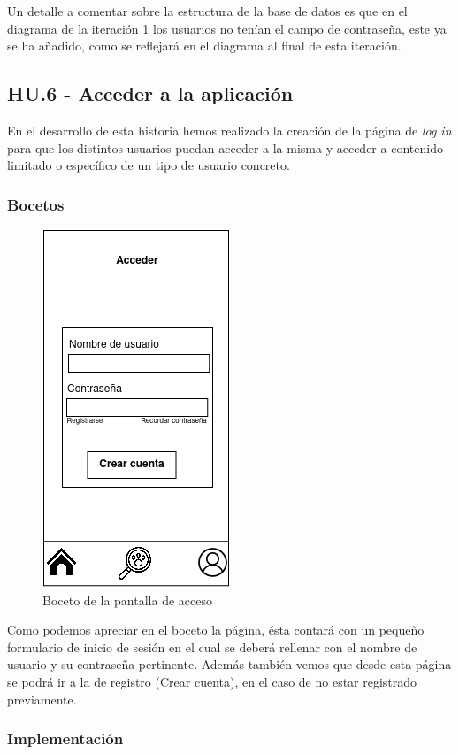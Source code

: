 Un detalle a comentar sobre la estructura de la base de datos es que en el diagrama de la iteración 1 los usuarios no tenían el campo de contraseña, este ya se ha añadido, como se reflejará en el diagrama al final de esta iteración. \\


\subsection{HU.6 - Acceder a la aplicación}

En el desarrollo de esta historia hemos realizado la creación de la página de \textit{log in} para que los distintos usuarios puedan acceder a la misma y acceder a contenido limitado o específico de un tipo de usuario concreto. \\ 

\subsubsection{Bocetos}


\begin{figure}[H]
	\centering
	\includegraphics[width=0.31\linewidth]{"sprint 2/hu6/login"}
	\caption{Boceto de la pantalla de acceso}
	\label{fig:login}
\end{figure}

Como podemos apreciar en el boceto la página, ésta contará con un pequeño formulario de inicio de sesión en el cual se deberá rellenar con el nombre de usuario y su contraseña pertinente. Además también vemos que desde esta página se podrá ir a la de registro (Crear cuenta), en el caso de no estar registrado previamente. \\

\subsubsection{Implementación}

